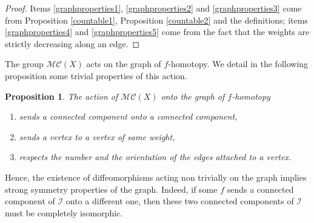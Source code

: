 \documentclass[JEP,XML,SOM,Unicode]{cedram}
\let\mathcal\mathscr
\theoremstyle{plain}
\newtheorem{proposition}[theorem]{Proposition}
\theoremstyle{definition}
\theoremstyle{remark}
\numberwithin{equation}{section}
\newcommand{\cI}{\mathcal{I}}
\begin{document}
\begin{proof}
Items \eqref{graphproperties1}, \eqref{graphproperties2} and \eqref{graphproperties3} come
from Proposition \ref{countable1}, Proposition \ref{countable2} and the definitions; items \eqref{graphproperties4} and \eqref{graphproperties5} come from the fact that the weights are strictly decreasing along an edge.
\end{proof}

The group $\mathcal M\mathcal C(X)$ acts on the graph of $f$-homotopy. We detail in the following proposition some trivial properties of this action.

\begin{proposition}
\label{graphaction}
The action of $\mathcal M\mathcal C(X)$ onto the graph of $f$-homotopy
\begin{enumerate}
\item
sends a connected component onto a connected component,
\item
sends a vertex to a vertex of same weight,
\item
respects the number and the orientation of the edges attached to a vertex.
\end{enumerate}
\end{proposition}

Hence, the existence of diffeomorphisms acting non trivially on the graph implies strong symmetry properties of the graph. Indeed, if some $f$ sends a connected component of $\cI$ onto a different one, then these two connected components of $\cI$ must be completely isomorphic.
\end{document}
